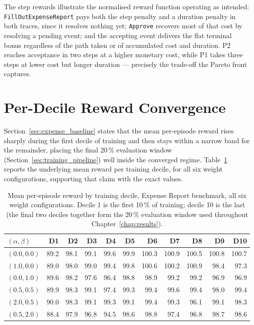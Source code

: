 \medskip
\noindent
The step rewards illustrate the normalised reward function operating
as intended: \texttt{FillOutExpenseReport} pays both the step penalty
and a duration penalty in both traces, since it resolves nothing yet;
\texttt{Approve} recovers most of that cost by resolving a pending
event; and the accepting event delivers the flat terminal bonus
regardless of the path taken or of accumulated cost and duration. P2
reaches acceptance in two steps at a higher monetary cost, while P1
takes three steps at lower cost but longer duration --- precisely the
trade-off the Pareto front captures.

\section{Per-Decile Reward Convergence}
\label{app:expense_reward_deciles}

Section~\ref{sec:expense_baseline} states that the mean per-episode
reward rises sharply during the first decile of training and then
stays within a narrow band for the remainder, placing the final
20\,\% evaluation window (Section~\ref{sec:training_pipeline}) well
inside the converged regime. Table~\ref{tab:expense_reward_deciles}
reports the underlying mean reward per training decile, for all six
weight configurations, supporting that claim with the exact values.

\begin{table}[H]
\centering
\footnotesize
\caption{Mean per-episode reward by training decile, Expense Report
benchmark, all six weight configurations. Decile 1 is the first
10\,\% of training; decile 10 is the last (the final two deciles
together form the 20\,\% evaluation window used throughout
Chapter~\ref{chap:results}).}
\label{tab:expense_reward_deciles}
{\renewcommand{\arraystretch}{1.4}
\setlength{\tabcolsep}{4pt}
\begin{tabular}{lrrrrrrrrrr}
\toprule
\textbf{$(\alpha,\beta)$} & \textbf{D1} & \textbf{D2} & \textbf{D3} & \textbf{D4} & \textbf{D5} & \textbf{D6} & \textbf{D7} & \textbf{D8} & \textbf{D9} & \textbf{D10} \\
\midrule
$(0.0, 0.0)$ & 89.2 & 98.1 & 99.1 & 99.6 & 99.9 & 100.3 & 100.9 & 100.5 & 100.8 & 100.7 \\
$(1.0, 0.0)$ & 89.0 & 98.0 & 99.0 & 99.4 & 99.8 & 100.6 & 100.2 & 100.9 & 98.4  & 97.3  \\
$(0.0, 1.0)$ & 89.6 & 98.2 & 97.6 & 96.4 & 98.8 & 98.9  & 99.2  & 99.2  & 96.9  & 96.9  \\
$(0.5, 0.5)$ & 89.9 & 98.3 & 99.1 & 97.4 & 99.3 & 99.4  & 99.6  & 99.4  & 98.0  & 99.4  \\
$(2.0, 0.5)$ & 90.0 & 98.3 & 99.1 & 99.3 & 99.1 & 99.4  & 99.3  & 96.1  & 99.1  & 98.3  \\
$(0.5, 2.0)$ & 88.4 & 97.9 & 96.8 & 94.5 & 98.6 & 98.8  & 97.4  & 96.8  & 98.7  & 98.6  \\
\bottomrule
\end{tabular}}
\end{table}


